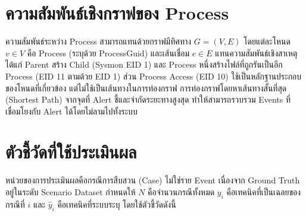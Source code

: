 
\section{ความสัมพันธ์เชิงกราฟของ Process}
ความสัมพันธ์ระหว่าง Process สามารถแทนด้วยกราฟมีทิศทาง $G=(V,E)$
โดยแต่ละโหนด $v \in V$ คือ Process (ระบุด้วย ProcessGuid)
และเส้นเชื่อม $e \in E$ แทนความสัมพันธ์เชิงสาเหตุ ได้แก่
Parent สร้าง Child (Sysmon EID 1) และ Process หนึ่งสร้างไฟล์ที่ถูกรันเป็นอีก Process (EID 11 ตามด้วย EID 1)
ส่วน Process Access (EID 10) ใช้เป็นหลักฐานประกอบของโหนดที่เกี่ยวข้อง แต่ไม่ใช้เป็นเส้นทางในการท่องกราฟ
การท่องกราฟโดยหาเส้นทางสั้นที่สุด (Shortest Path) จากจุดที่ Alert ชี้และจำกัดระยะทางสูงสุด
ทำให้สามารถรวบรวม Events ที่เชื่อมโยงกับ Alert ได้โดยไม่ลามไปทั้งระบบ

\section{ตัวชี้วัดที่ใช้ประเมินผล}
\label{sec:metrics}

หน่วยของการประเมินผลคือกรณีการสืบสวน (Case) ไม่ใช่ราย Event เนื่องจาก Ground Truth อยู่ในระดับ Scenario Dataset
กำหนดให้ $N$ คือจำนวนกรณีทั้งหมด $y_i$ คือเทคนิคที่เป็นเฉลยของกรณีที่ $i$
และ $\hat{y}_i$ คือเทคนิคที่ระบบระบุ โดยใช้ตัวชี้วัดดังนี้

